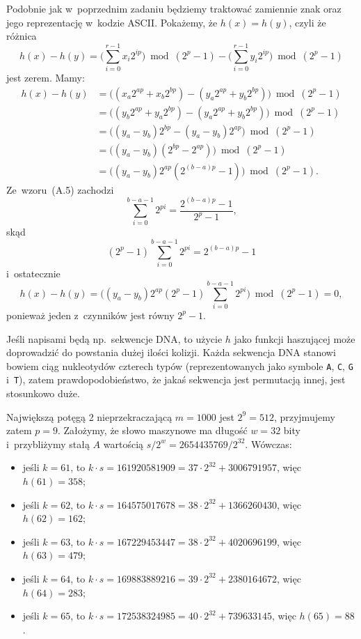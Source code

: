 Podobnie jak w~poprzednim zadaniu będziemy traktować zamiennie znak oraz jego reprezentację w~kodzie ASCII\@. Pokażemy, że $h(x)=h(y)$, czyli że różnica
\[
	h(x)-h(y) = \biggl(\sum_{i=0}^{r-1}x_i2^{ip}\biggr)\bmod(2^p-1)-\biggl(\sum_{i=0}^{r-1}y_i2^{ip}\biggr)\bmod(2^p-1)
\]
jest zerem. Mamy:
\begin{align*}
	h(x)-h(y) &= \bigl((x_a2^{ap}+x_b2^{bp})-(y_a2^{ap}+y_b2^{bp})\bigr)\bmod(2^p-1) \\
	&= \bigl((y_b2^{ap}+y_a2^{bp})-(y_a2^{ap}+y_b2^{bp})\bigr)\bmod(2^p-1) \\
	&= \bigl((y_a-y_b)2^{bp}-(y_a-y_b)2^{ap}\bigr)\bmod(2^p-1) \\
	&= \bigl((y_a-y_b)(2^{bp}-2^{ap})\bigr)\bmod(2^p-1) \\
	&= \bigl((y_a-y_b)2^{ap}(2^{(b-a)p}-1)\bigr)\bmod(2^p-1).
\end{align*}
Ze~wzoru~(A.5) zachodzi
\[
	\sum_{i=0}^{b-a-1}2^{pi} = \frac{2^{(b-a)p}-1}{2^p-1},
\]
skąd
\[
	(2^p-1)\sum_{i=0}^{b-a-1}2^{pi} = 2^{(b-a)p}-1
\]
i~ostatecznie
\[
	h(x)-h(y) = \biggl((y_a-y_b)2^{ap}(2^p-1)\sum_{i=0}^{b-a-1}2^{pi}\biggr)\bmod(2^p-1) = 0,
\]
ponieważ jeden z~czynników jest równy $2^p-1$.

Jeśli napisami będą np.\ sekwencje DNA, to użycie $h$ jako funkcji haszującej może doprowadzić do powstania dużej ilości kolizji. Każda sekwencja DNA stanowi bowiem ciąg nukleotydów czterech typów (reprezentowanych jako symbole \texttt{A}, \texttt{C}, \texttt{G} i~\texttt{T}), zatem prawdopodobieństwo, że jakaś sekwencja jest permutacją innej, jest stosunkowo duże.

\exercise %
Największą potęgą 2 nieprzekraczającą $m=1000$ jest $2^9=512$, przyjmujemy zatem $p=9$. Założymy, że słowo maszynowe ma długość $w=32$ bity i~przybliżymy stałą $A$ wartością $s/2^w=2654435769/2^{32}$. Wówczas:
\begin{itemize}
	\item jeśli $k=61$, to $k\cdot s=161920581909=37\cdot2^{32}+3006791957$, więc $h(61)=358$;
	\item jeśli $k=62$, to $k\cdot s=164575017678=38\cdot2^{32}+1366260430$, więc $h(62)=162$;
	\item jeśli $k=63$, to $k\cdot s=167229453447=38\cdot2^{32}+4020696199$, więc $h(63)=479$;
	\item jeśli $k=64$, to $k\cdot s=169883889216=39\cdot2^{32}+2380164672$, więc $h(64)=283$;
	\item jeśli $k=65$, to $k\cdot s=172538324985=40\cdot2^{32}+739633145$, więc $h(65)=88$.
\end{itemize}

